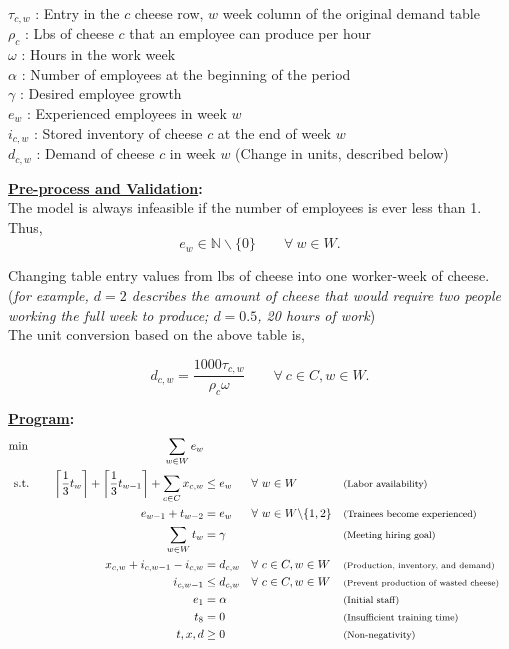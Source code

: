 \documentclass[12pt]{amsart}
\begin{document}
\noindent
\(\tau_{c,w}\) : Entry in the \(c\) cheese row, \(w\) week column of the original demand table \\
\(\rho_c\) : Lbs of cheese \(c\) that an employee can produce per hour \\
\(\omega\) : Hours in the work week \\
\(\alpha\) : Number of employees at the beginning of the period \\
\(\gamma\) : Desired employee growth \\

\noindent
\(e_w\) : Experienced employees in week \(w\) \\
\(i_{c,w}\) : Stored inventory of cheese \(c\) at the end of week \(w\) \\
\(d_{c,w}\) : Demand of cheese \(c\) in week \(w\) (Change in units, described below)

\textbf{\underline{Pre-process and Validation}:} \\

The model is always infeasible if the number of employees is ever less than 1. Thus,
\[e_w \in \mathbb N \backslash \{0\} \qquad \forall\ w\in W .\]

Changing table entry values from lbs of cheese into one worker-week of cheese. \\
(\textit{for example, \(d=2\) describes the amount of cheese that 
	would require two people working the full week to produce; \(d=0.5\),
	20 hours of work})\\
The unit conversion based on the above table is,

\[ d_{c,w} = \frac{1000\tau_{c,w}}{\rho_c \omega} \qquad \forall\ c\in C, w\in W.  \]

\textbf{\underline{Program}:} \\

\begin{align*}
	\min \hspace{27ex}   \sum_{w\in W}e_w & & & \\
	\text{s.t.} \qquad \left\lceil\frac{1}{3}t_w \right\rceil + \left\lceil\frac{1}{3}t_{w-1} \right\rceil 
	+ \sum_{c\in C}x_{c,w} &\leq e_w & &\forall\ w\in W & &\text{\footnotesize(Labor availability)} \\
	e_{w-1} + t_{w-2} &= e_w & &\forall\ w\in W\backslash\{1,2\} & &\text{\footnotesize(Trainees become experienced)} \\
	\sum_{w\in W}t_w &= \gamma && & &\text{\footnotesize(Meeting hiring goal)} \\
	x_{c,w} + i_{c,w-1} - i_{c,w} &= d_{c,w} & &\forall\ c\in C, w\in W & &\text{\scriptsize(Production, inventory, and demand)} \\
	i_{c,w-1} &\leq d_{c,w} & &\forall\ c\in C, w\in W & &\text{\scriptsize(Prevent production of wasted cheese)} \\
	e_1 &=\alpha & &\ & &\text{\footnotesize(Initial staff)} \\
	t_8 &= 0 & &\ & &\text{\footnotesize(Insufficient training time)} \\
	t,x,d &\geq0 & &\ & &\text{\footnotesize(Non-negativity)} \\
\end{align*}
\end{document}
